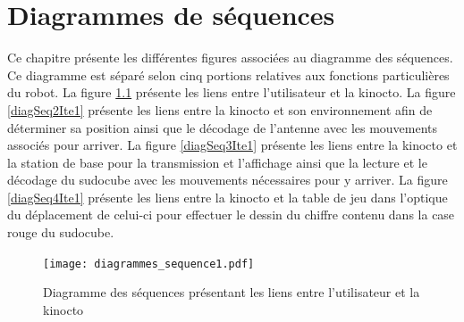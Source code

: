 


\chapter{Diagrammes de séquences}
\label{s:sequences}
Ce chapitre présente les différentes figures associées au diagramme des séquences. Ce diagramme est séparé selon cinq portions relatives aux fonctions particulières du robot. La figure \ref{fig:diagSeq1Ite1} présente les liens entre l'utilisateur et la kinocto. La figure \ref{diagSeq2Ite1} présente les liens entre la kinocto et son environnement afin de déterminer sa position ainsi que le décodage de l'antenne avec les mouvements associés pour arriver. La figure \ref{diagSeq3Ite1} présente les liens entre la kinocto et la station de base pour la transmission et l'affichage ainsi que la lecture et le décodage du sudocube avec les mouvements nécessaires pour y arriver. La figure \ref{diagSeq4Ite1} présente les liens entre la kinocto et la table de jeu dans l'optique du déplacement de celui-ci pour effectuer le dessin du chiffre contenu dans la case rouge du sudocube.
\begin{figure}[htb]
\centering
\texttt{[image: diagrammes\_sequence1.pdf]}
\caption{Diagramme des séquences présentant les liens entre l'utilisateur et la kinocto}
\label{fig:diagSeq1Ite1} 
\end{figure}

